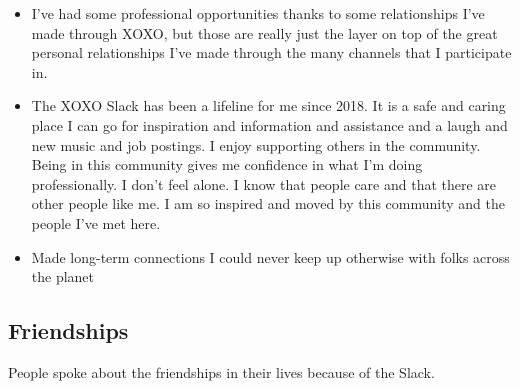 \documentclass[
]{book}
\begin{document}
\begin{itemize}
\item
  I've had some professional opportunities thanks to some relationships I've made through XOXO, but those are really just the layer on top of the great personal relationships I've made through the many channels that I participate in.
\item
  The XOXO Slack has been a lifeline for me since 2018. It is a safe and caring place I can go for inspiration and information and assistance and a laugh and new music and job postings. I enjoy supporting others in the community. Being in this community gives me confidence in what I'm doing professionally. I don't feel alone. I know that people care and that there are other people like me. I am so inspired and moved by this community and the people I've met here.
\item
  Made long-term connections I could never keep up otherwise with folks across the planet
\end{itemize}

\subsection{Friendships}\label{friendships}

People spoke about the friendships in their lives because of the Slack.
\end{document}

